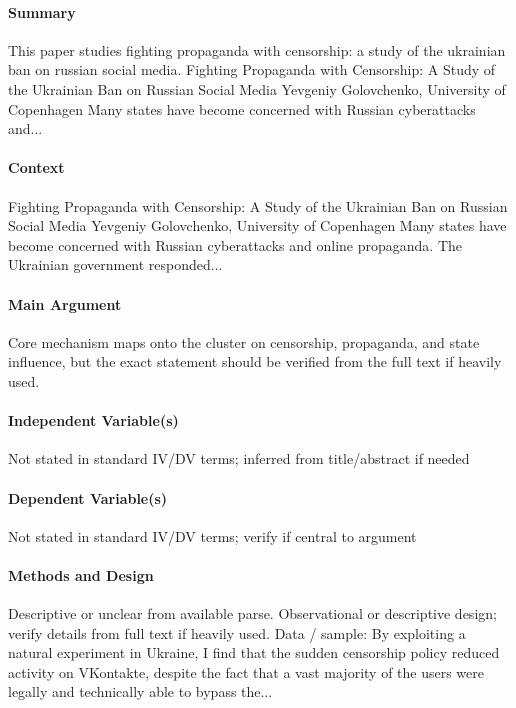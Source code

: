 \documentclass[12pt]{article}
\begin{document}
\paragraph{Summary} This paper studies fighting propaganda with censorship: a study of the ukrainian ban on russian social media. Fighting Propaganda with Censorship: A Study of the Ukrainian Ban on Russian Social Media Yevgeniy Golovchenko, University of Copenhagen Many states have become concerned with Russian cyberattacks and...

\paragraph{Context} Fighting Propaganda with Censorship: A Study of the Ukrainian Ban on Russian Social Media Yevgeniy Golovchenko, University of Copenhagen Many states have become concerned with Russian cyberattacks and online propaganda. The Ukrainian government responded...

\paragraph{Main Argument} Core mechanism maps onto the cluster on censorship, propaganda, and state influence, but the exact statement should be verified from the full text if heavily used.

\paragraph{Independent Variable(s)} Not stated in standard IV/DV terms; inferred from title/abstract if needed

\paragraph{Dependent Variable(s)} Not stated in standard IV/DV terms; verify if central to argument

\paragraph{Methods and Design} Descriptive or unclear from available parse. Observational or descriptive design; verify details from full text if heavily used. Data / sample: By exploiting a natural experiment in Ukraine, I find that the sudden censorship policy reduced activity on VKontakte, despite the fact that a vast majority of the users were legally and technically able to bypass the...
\end{document}

